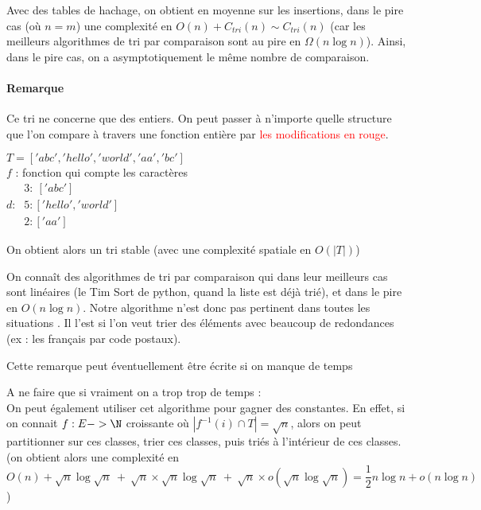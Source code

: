 Avec des tables de hachage, on obtient en moyenne sur les insertions, dans le pire cas (où $n = m$) une complexité en $O(n) + C_{tri}(n) \sim C_{tri}(n)$ (car les meilleurs algorithmes de tri par comparaison sont au pire en $\Omega(n \log n)$). Ainsi, dans le pire cas, on a asymptotiquement le même nombre de comparaison.


\paragraph{Remarque} Ce tri ne concerne que des entiers. On peut passer à n'importe quelle structure que l'on compare à travers une fonction entière par \textcolor{red}{les modifications en rouge}.

\begin{example}
	$T = ['abc', 'hello', 'world', 'aa', 'bc']$\\
	$f$ : fonction qui compte les caractères \\
	$d :\: \begin{array}{l}
	3 : \: ['abc'] \\
	5 : ['hello ', 'world']\\
	2 : ['aa']
	\end{array}$
\end{example}

\begin{proposition}
	On obtient alors un tri stable (avec une complexité spatiale en $O(|T|)$)
\end{proposition}

\begin{com}
	On connaît des algorithmes de tri par comparaison qui dans leur meilleurs cas sont linéaires (le Tim Sort de python, quand la liste est déjà trié), et dans le pire en $O(n \log n)$. Notre algorithme n'est donc pas pertinent dans toutes les situations . Il l'est si l'on veut trier des éléments avec beaucoup de redondances (ex : les français par code postaux).
\end{com}

\begin{com}
	Cette remarque peut éventuellement être écrite si on manque de temps
\end{com}

\begin{com}
	A ne faire que si vraiment on a trop trop de temps :\\
	On peut également utiliser cet algorithme pour gagner des constantes. En effet, si on connait $f:E -> \N$ croissante où $\left| f^{-1}(i) \cap T \right| = \sqrt n$, alors on peut partitionner sur ces classes, trier ces classes, puis triés à l'intérieur de ces classes. (on obtient alors une complexité en $O(n) + \sqrt n\log \sqrt n \: + \: \sqrt n \times \sqrt n \log \sqrt n \: + \: \sqrt n \times o(\sqrt n \log \sqrt n) = \dfrac{1}{2} n\log n + o(n \log n)$)
\end{com}